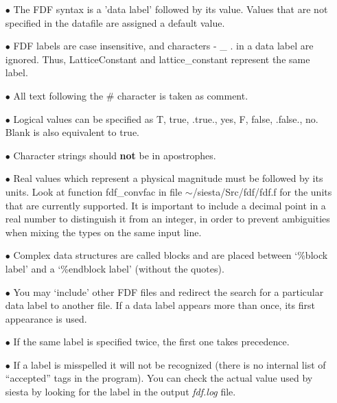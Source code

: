 \documentclass[11pt]{article}
\begin{document}
\begin{itemize}

\item[$\bullet$] The FDF syntax is a 'data label' followed by its value.
Values that are not specified in the datafile are assigned
a default value.

\item[$\bullet$] FDF labels are case insensitive, and characters - \_ .
in a data label are ignored. Thus, LatticeConstant and
lattice\_constant represent the same label.

\item[$\bullet$] All text following the \# character is taken as comment.

\item[$\bullet$] Logical values can be specified as T, true, .true.,
yes, F, false, .false., no. Blank is also equivalent to true.

\item[$\bullet$] Character strings should {\bf not} be in apostrophes.

\item[$\bullet$] Real values which represent a physical magnitude must be
followed by its units. Look at function fdf\_convfac in
file $\sim$/siesta/Src/fdf/fdf.f for the units that are currently supported.
It is important to include a decimal point in a real number to distinguish
it from an integer, in order to prevent ambiguities when mixing the types
on the same input line.

\item[$\bullet$] Complex data structures are called blocks and are
placed between `\%block label' and a `\%endblock label'
(without the quotes).

\item[$\bullet$] You may `include' other FDF files and redirect the search
for a particular data label to another file.
If a data label appears more than once, its first appearance
is used.

\item[$\bullet$] If the same label is specified twice, the first one takes precedence.

\item[$\bullet$] If a label is misspelled it will not be recognized (there is no
  internal list of ``accepted'' tags in the program). You can check 
  the actual value used by siesta by looking for the label in the
  output {\it fdf.log} file.

\end{itemize}
\end{document}
